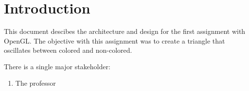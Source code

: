 \section{Introduction}

This document descibes the architecture and design for the first assignment with OpenGL.
The objective with this assignment was to create a triangle that oscillates between colored and non-colored.

\vspace{1cm}

There is a single major stakeholder:
\begin{enumerate}
    \item The professor
\end{enumerate}